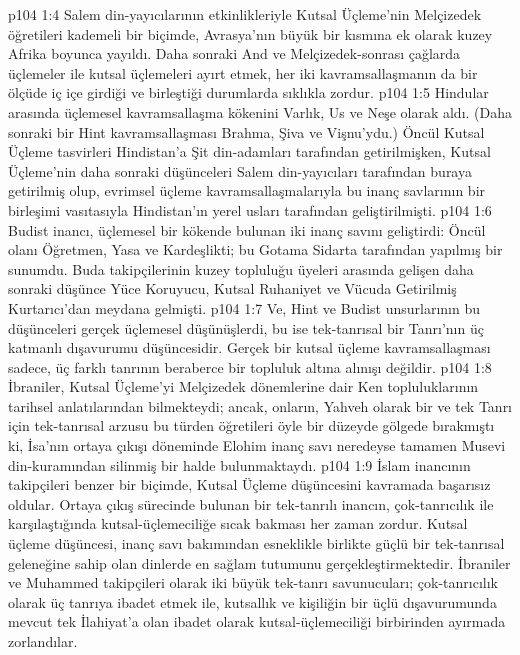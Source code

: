 \vs p104 1:4 Salem din\hyp{}yayıcılarının etkinlikleriyle Kutsal Üçleme’nin Melçizedek öğretileri kademeli bir biçimde, Avrasya’nın büyük bir kısmına ek olarak kuzey Afrika boyunca yayıldı. Daha sonraki And ve Melçizedek\hyp{}sonrası çağlarda üçlemeler ile kutsal üçlemeleri ayırt etmek, her iki kavramsallaşmanın da bir ölçüde iç içe girdiği ve birleştiği durumlarda sıklıkla zordur.
\vs p104 1:5 Hindular arasında üçlemesel kavramsallaşma kökenini Varlık, Us ve Neşe olarak aldı. (Daha sonraki bir Hint kavramsallaşması Brahma, Şiva ve Vişnu’ydu.) Öncül Kutsal Üçleme tasvirleri Hindistan’a Şit din\hyp{}adamları tarafından getirilmişken, Kutsal Üçleme’nin daha sonraki düşünceleri Salem din\hyp{}yayıcıları tarafından buraya getirilmiş olup, evrimsel üçleme kavramsallaşmalarıyla bu inanç savlarının bir birleşimi vasıtasıyla Hindistan’ın yerel usları tarafından geliştirilmişti.
\vs p104 1:6 Budist inancı, üçlemesel bir kökende bulunan iki inanç savını geliştirdi: Öncül olanı Öğretmen, Yasa ve Kardeşlikti; bu Gotama Sidarta tarafından yapılmış bir sunumdu. Buda takipçilerinin kuzey topluluğu üyeleri arasında gelişen daha sonraki düşünce Yüce Koruyucu, Kutsal Ruhaniyet ve Vücuda Getirilmiş Kurtarıcı’dan meydana gelmişti.
\vs p104 1:7 Ve, Hint ve Budist unsurlarının bu düşünceleri gerçek üçlemesel düşünüşlerdi, bu ise tek\hyp{}tanrısal bir Tanrı’nın üç katmanlı dışavurumu düşüncesidir. Gerçek bir kutsal üçleme kavramsallaşması sadece, üç farklı tanrının beraberce bir topluluk altına alınışı değildir.
\vs p104 1:8 İbraniler, Kutsal Üçleme’yi Melçizedek dönemlerine dair Ken topluluklarının tarihsel anlatılarından bilmekteydi; ancak, onların, Yahveh olarak bir ve tek Tanrı için tek\hyp{}tanrısal arzusu bu türden öğretileri öyle bir düzeyde gölgede bırakmıştı ki, İsa’nın ortaya çıkışı döneminde Elohim inanç savı neredeyse tamamen Musevi din\hyp{}kuramından silinmiş bir halde bulunmaktaydı.
\vs p104 1:9 İslam inancının takipçileri benzer bir biçimde, Kutsal Üçleme düşüncesini kavramada başarısız oldular. Ortaya çıkış sürecinde bulunan bir tek\hyp{}tanrılı inancın, çok\hyp{}tanrıcılık ile karşılaştığında kutsal\hyp{}üçlemeciliğe sıcak bakması her zaman zordur. Kutsal üçleme düşüncesi, inanç savı bakımından esneklikle birlikte güçlü bir tek\hyp{}tanrısal geleneğine sahip olan dinlerde en sağlam tutumunu gerçekleştirmektedir. İbraniler ve Muhammed takipçileri olarak iki büyük tek\hyp{}tanrı savunucuları; çok\hyp{}tanrıcılık olarak üç tanrıya ibadet etmek ile, kutsallık ve kişiliğin bir üçlü dışavurumunda mevcut tek İlahiyat’a olan ibadet olarak kutsal\hyp{}üçlemeciliği birbirinden ayırmada zorlandılar.
